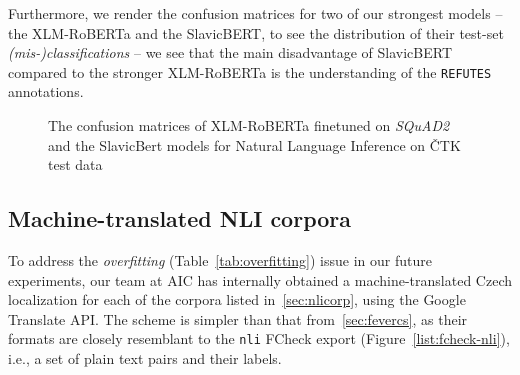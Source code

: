Furthermore, we render the confusion matrices for two of our strongest models -- the \textsf{XLM-RoBERTa} and the \textsf{SlavicBERT}, to see the distribution of their \textsf{test}-set \textit{(mis-)classifications} -- we see that the main disadvantage of \textsf{SlavicBERT} compared to the stronger \textsf{XLM-RoBERTa} is the understanding of the \texttt{REFUTES} annotations.
\begin{figure}[H]
\vspace{2em}
\caption[Confusion Matrices of XLM-RoBERTa and SlavicBERT]{The confusion matrices of \textsf{XLM-RoBERTa} finetuned on \textit{SQuAD2} and the \textsf{SlavicBert} models for Natural Language Inference on \textsf{ČTK} test data}
\label{fig:confmat}
\end{figure} %



\subsection{Machine-translated NLI corpora}
To address the \textit{overfitting} (Table~\ref{tab:overfitting}) issue in our future experiments, our team at \textsf{AIC} has internally obtained a machine-translated Czech localization for each of the corpora listed in~\ref{sec:nlicorp},  using the \textsf{Google Translate API}. The scheme is simpler than that from~\ref{sec:fevercs}, as their formats are closely resemblant to the \texttt{nli} \textsf{FCheck} export (Figure~\ref{list:fcheck-nli}), i.e., a set of plain text pairs and their labels.

